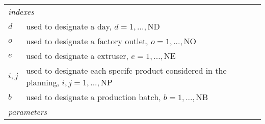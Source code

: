 \begin{table}[h!]
\begin{center}
\footnotesize
	\begin{tabular}{ l l } 
		\multicolumn{2}{l}{\emph{indexes}} \\

		$d$ & used to designate a day, $d = 1, ..., \mathrm{ND}$ \\
		$o$ & used to designate a factory outlet, $o = 1, ..., \mathrm{NO}$  \\
		$e$ & used to designate a extruser, $e = 1, ..., \mathrm{NE}$\\
		$i, j$ & used to designate each specifc product considered in the planning, $i, j = 1, ..., \mathrm{NP}$ \\
		$b$ & used to designate a production batch, $b = 1, ..., \mathrm{NB}$ \\
		
		\multicolumn{2}{l}{\emph{parameters}} \\ 


\end{tabular}
\end{center}
\end{table}
